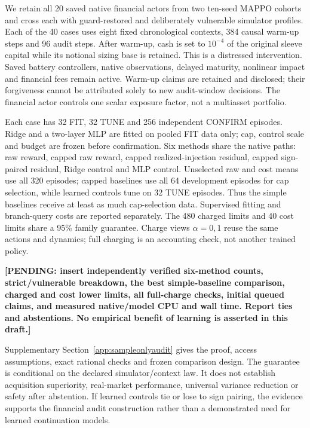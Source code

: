 We retain all 20 saved native financial actors from two ten-seed MAPPO cohorts and cross each with guard-restored and deliberately vulnerable simulator profiles. Each of the 40 cases uses eight fixed chronological contexts, 384 causal warm-up steps and 96 audit steps. After warm-up, cash is set to $10^{-4}$ of the original sleeve capital while its notional sizing base is retained. This is a distressed intervention. Saved battery controllers, native observations, delayed maturity, nonlinear impact and financial fees remain active. Warm-up claims are retained and disclosed; their forgiveness cannot be attributed solely to new audit-window decisions. The financial actor controls one scalar exposure factor, not a multiasset portfolio.

Each case has 32 FIT, 32 TUNE and 256 independent CONFIRM episodes. Ridge and a two-layer MLP are fitted on pooled FIT data only; cap, control scale and budget are frozen before confirmation. Six methods share the native paths: raw reward, capped raw reward, capped realized-injection residual, capped sign-paired residual, Ridge control and MLP control. Unselected raw and cost means use all 320 episodes; capped baselines use all 64 development episodes for cap selection, while learned controls tune on 32 TUNE episodes. Thus the simple baselines receive at least as much cap-selection data. Supervised fitting and branch-query costs are reported separately. The 480 charged limits and 40 cost limits share a 95\% family guarantee. Charge views $\alpha=0,1$ reuse the same actions and dynamics; full charging is an accounting check, not another trained policy.

\textbf{[PENDING: insert independently verified six-method counts, strict/vulnerable breakdown, the best simple-baseline comparison, charged and cost lower limits, all full-charge checks, initial queued claims, and measured native/model CPU and wall time. Report ties and abstentions. No empirical benefit of learning is asserted in this draft.]}

Supplementary Section~\ref{app:sampleonlyaudit} gives the proof, access assumptions, exact rational checks and frozen comparison design. The guarantee is conditional on the declared simulator/context law. It does not establish acquisition superiority, real-market performance, universal variance reduction or safety after abstention. If learned controls tie or lose to sign pairing, the evidence supports the financial audit construction rather than a demonstrated need for learned continuation models.
